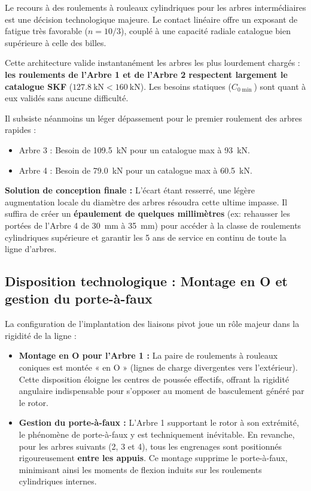 \documentclass[11pt,a4paper]{article}
\begin{document}
\begin{tcolorbox}[colback=BoxBg, colframe=TealAccent, arc=4pt, boxrule=1pt, title=\textbf{Conclusion critique et solutions de conception}]
Le recours à des roulements à rouleaux cylindriques pour les arbres intermédiaires est une décision technologique majeure. Le contact linéaire offre un exposant de fatigue très favorable ($n=10/3$), couplé à une capacité radiale catalogue bien supérieure à celle des billes. 

Cette architecture valide instantanément les arbres les plus lourdement chargés : \textbf{les roulements de l'Arbre 1 et de l'Arbre 2 respectent largement le catalogue SKF} ($\qty{127,8}{\kilo\newton} < \qty{160}{\kilo\newton}$). Les besoins statiques ($C_{0\min}$) sont quant à eux validés sans aucune difficulté.

Il subsiste néanmoins un léger dépassement pour le premier roulement des arbres rapides :
\begin{itemize}
    \item Arbre 3 : Besoin de \qty{109,5}{\kilo\newton} pour un catalogue max à \qty{93}{\kilo\newton}.
    \item Arbre 4 : Besoin de \qty{79,0}{\kilo\newton} pour un catalogue max à \qty{60,5}{\kilo\newton}.
\end{itemize}

\textbf{Solution de conception finale :} L'écart étant resserré, une légère augmentation locale du diamètre des arbres résoudra cette ultime impasse. Il suffira de créer un \textbf{épaulement de quelques millimètres} (ex: rehausser les portées de l'Arbre 4 de \qty{30}{\milli\meter} à \qty{35}{\milli\meter}) pour accéder à la classe de roulements cylindriques supérieure et garantir les 5 ans de service en continu de toute la ligne d'arbres.
\end{tcolorbox}

\subsection{Disposition technologique : Montage en O et gestion du porte-à-faux}

La configuration de l'implantation des liaisons pivot joue un rôle majeur dans la rigidité de la ligne :
\begin{itemize}
    \item \textbf{Montage en O pour l'Arbre 1 :} La paire de roulements à rouleaux coniques est montée « en O » (lignes de charge divergentes vers l'extérieur). Cette disposition éloigne les centres de poussée effectifs, offrant la rigidité angulaire indispensable pour s'opposer au moment de basculement généré par le rotor.
    \item \textbf{Gestion du porte-à-faux :} L'Arbre 1 supportant le rotor à son extrémité, le phénomène de porte-à-faux y est techniquement inévitable. En revanche, pour les arbres suivants (2, 3 et 4), tous les engrenages sont positionnés rigoureusement \textbf{entre les appuis}. Ce montage supprime le porte-à-faux, minimisant ainsi les moments de flexion induits sur les roulements cylindriques internes.
\end{itemize}
\end{document}
